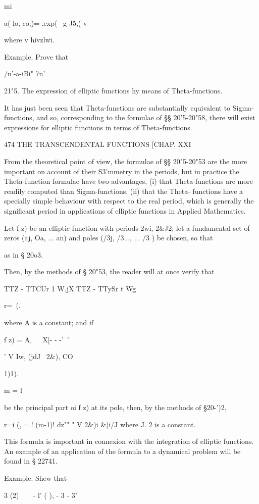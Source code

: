 mi

a( lo, co,)=-,exp( --g J5,( v

where v hivzlwi.

Example. Prove that

/n'-a-iBi" 7n'\

21"5. The expression of elliptic functions hy means of
Theta-functions.

It has just been seen that Theta-functions are substantially
equivalent to Sigma-functions, and so, corresponding to the formulae
of §§ 20'5-20"58, there will exist expressions for elliptic functions
in terms of Theta-functions.

474 THE TRANSCENDENTAL FUNCTIONS [CHAP. XXI

From the theoretical point of view, the formulae of §§ 20"5-20"53 are
the more important on account of their S3'mmetry in the periods, but
in practice the Theta-function formulae have two advantages, (i) that
Theta-functions are more readily computed than Sigma-functions, (ii)
that the Theta- functions have a specially simple behaviour with
respect to the real period, which is generally the significant period
in applications of elliptic functions in Applied Mathematics.

Let f z) be an elliptic function with periods 2wi, 2\&J2; let a
fundamental set of zeros (aj, Oa, ... an) and poles (/3j, /3..., ...
/3 ) be chosen, so that

as in § 20o3.

Then, by the methods of § 20"53, the reader will at once verify that

TTZ - TTCUr 1 W.jX TTZ - TTySr t Wg

r=\ (.

where A is a constant; and if

f z) = A,\ \ \ X[- - -'~' \ \ %

' V Iw, (jdJ \ 2\&), CO

1)1).

m = l

be the principal part oi f z) at its pole, then, by the methods of
§20-')2,

r=i (, =.! (m-1)! dz"" " V 2\&)i \&)i/J where J. 2 is a constant.

This formula is important in connexion with the integration of
elliptic functions. An example of an application of the formula to a
dynamical problem will be found in § 22741.

Example. Shew that

  3 (2)\ \ \ \ - l' ( ), - 3 - 3"

